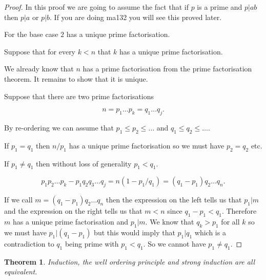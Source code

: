 \documentclass[
]{book}
\newtheorem{theorem}{Theorem}[chapter]
\theoremstyle{definition}
\theoremstyle{definition}
\theoremstyle{definition}
\theoremstyle{definition}
\theoremstyle{remark}
\begin{document}
\begin{proof}
In this proof we are going to assume the fact that if \(p\) is a prime and \(p|ab\) then \(p|a\) or \(p|b\). If you are doing ma132 you will see this proved later.

For the base case \(2\) has a unique prime factorisation.

Suppose that for every \(k < n\) that \(k\) has a unique prime factorisation.

We already know that \(n\) has a prime factorisation from the prime factorisation theorem. It remains to show that it is unique.

Suppose that there are two prime factorisations

\[ n=p_1\dots p_k = q_1 \dots q_j.  \]

By re-ordering we can assume that \(p_1 \leq p_2 \leq \dots\) and \(q_1 \leq q_2 \leq \dots\).

If \(p_1=q_1\) then \(n/p_1\) has a unique prime factorisation so we must have \(p_2=q_2\) etc.

If \(p_1 \neq q_1\) then without loss of generality \(p_1 < q_1\).

\[ p_1p_2 \dots p_k - p_1 q_2 q_3 \dots q_j = n (1-p_1/q_1) = (q_1-p_1)q_2\dots q_n.\]

If we call \(m = (q_1-p_1)q_2 \dots q_n\) then the expression on the left tells us that \(p_1|m\) and the expression on the right tells us that \(m < n\) since \(q_1-p_1 < q_1\). Therefore \(m\) has a unique prime factorisation and \(p_1|m\). We know that \(q_k > p_1\) for all \(k\) so we must have \(p_1|(q_1-p_1)\) but this would imply that \(p_1|q_1\) which is a contradiction to \(q_1\) being prime with \(p_1<q_1\). So we cannot have \(p_1 \neq q_1\).
\end{proof}

\begin{theorem}
Induction, the well ordering principle and strong induction are all equivalent.
\end{theorem}
\end{document}
